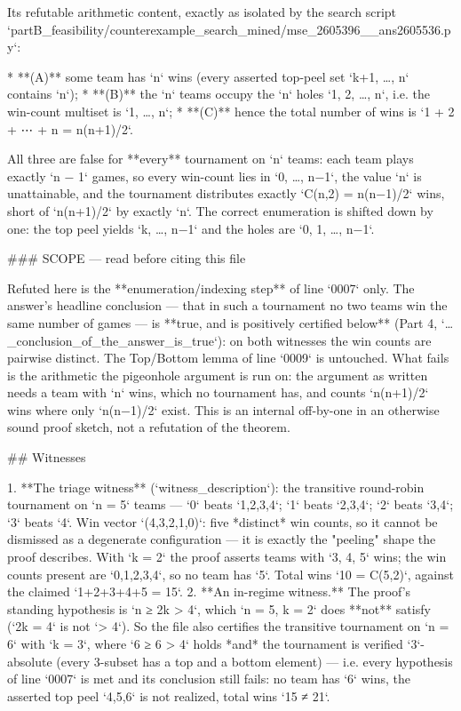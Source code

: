 \documentclass[11pt]{article}
\begin{document}
\begin{Vlean}
Its refutable arithmetic content, exactly as isolated by the search script
`partB_feasibility/counterexample_search_mined/mse_2605396__ans2605536.py`:

* **(A)** some team has `n` wins (every asserted top-peel set `{k+1, …, n}` contains `n`);
* **(B)** the `n` teams occupy the `n` holes `{1, 2, …, n}`, i.e. the win-count multiset is
  `{1, …, n}`;
* **(C)** hence the total number of wins is `1 + 2 + ⋯ + n = n(n+1)/2`.

All three are false for **every** tournament on `n` teams: each team plays exactly `n − 1`
games, so every win-count lies in `{0, …, n−1}`, the value `n` is unattainable, and the
tournament distributes exactly `C(n,2) = n(n−1)/2` wins, short of `n(n+1)/2` by exactly `n`.
The correct enumeration is shifted down by one: the top peel yields `{k, …, n−1}` and the
holes are `{0, 1, …, n−1}`.

### SCOPE — read before citing this file

Refuted here is the **enumeration/indexing step** of line `0007` only.  The answer's headline
conclusion — that in such a tournament no two teams win the same number of games — is
**true, and is positively certified below** (Part 4, `…_conclusion_of_the_answer_is_true`):
on both witnesses the win counts are pairwise distinct.  The Top/Bottom lemma of line `0009`
is untouched.  What fails is the arithmetic the pigeonhole argument is run on: the argument as
written needs a team with `n` wins, which no tournament has, and counts `n(n+1)/2` wins where
only `n(n−1)/2` exist.  This is an internal off-by-one in an otherwise sound proof sketch, not
a refutation of the theorem.

## Witnesses

1. **The triage witness** (`witness_description`): the transitive round-robin tournament on
   `n = 5` teams — `0` beats `1,2,3,4`; `1` beats `2,3,4`; `2` beats `3,4`; `3` beats `4`.
   Win vector `(4,3,2,1,0)`: five *distinct* win counts, so it cannot be dismissed as a
   degenerate configuration — it is exactly the "peeling" shape the proof describes.  With
   `k = 2` the proof asserts teams with `3, 4, 5` wins; the win counts present are
   `{0,1,2,3,4}`, so no team has `5`.  Total wins `10 = C(5,2)`, against the claimed
   `1+2+3+4+5 = 15`.
2. **An in-regime witness.**  The proof's standing hypothesis is `n ≥ 2k > 4`, which
   `n = 5, k = 2` does **not** satisfy (`2k = 4` is not `> 4`).  So the file also certifies the
   transitive tournament on `n = 6` with `k = 3`, where `6 ≥ 6 > 4` holds *and* the tournament
   is verified `3`-absolute (every 3-subset has a top and a bottom element) — i.e. every
   hypothesis of line `0007` is met and its conclusion still fails: no team has `6` wins,
   the asserted top peel `{4,5,6}` is not realized, total wins `15 ≠ 21`.


\end{Vlean}
\end{document}
